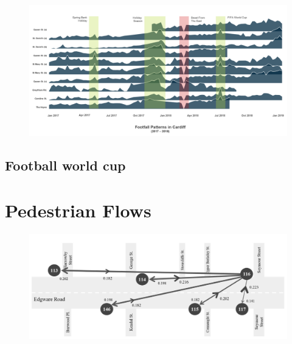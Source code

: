 \begin{figure}
  \forceversofloat
  \includegraphics[trim={0 50 0 0},clip]{images/applications-cardiff-footfall.png}
  \caption{}
  \label{}
\end{figure}

\lipsum[1]


\subsection{Football world cup}


\section{Pedestrian Flows}

\begin{figure}
  \forceversofloat
  \includegraphics[trim={0 0 0 0},clip]{images/applications-transfer-entropy.png}
  \caption{}
  \label{}
\end{figure}

